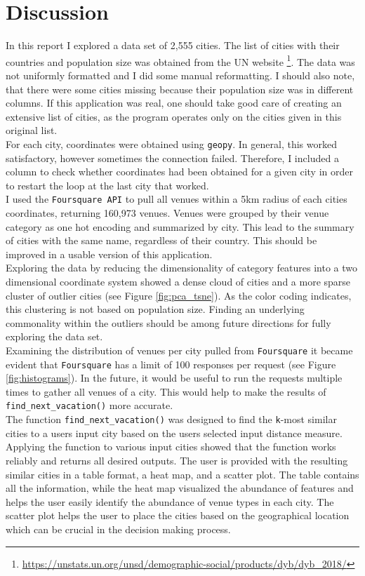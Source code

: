 \documentclass[11pt,a4paper,final]{article}
\begin{document}
\section{Discussion}
In this report I explored a data set of 2,555 cities. The list of cities with their countries and population size was obtained from the UN website \footnote{\url{https://unstats.un.org/unsd/demographic-social/products/dyb/dyb_2018/}}. The data was not uniformly formatted and I did some manual reformatting. I should also note, that there were some cities missing because their population size was in different columns. If this application was real, one should take good care of creating an extensive list of cities, as the program operates only on the cities given in this original list.\\
For each city, coordinates were obtained using \texttt{geopy}. In general, this worked satisfactory, however sometimes the connection failed. Therefore, I included a column to check whether coordinates had been obtained for a given city in order to restart the loop at the last city that worked. \\
I used the \texttt{Foursquare API} to pull all venues within a 5km radius of each cities coordinates, returning 160,973 venues. Venues were grouped by their venue category as one hot encoding and summarized by city. This lead to the summary of cities with the same name, regardless of their country. This should be improved in a usable version of this application.\\
Exploring the data by reducing the dimensionality of category features into a two dimensional coordinate system showed a dense cloud of cities and a more sparse cluster of outlier cities (see Figure \ref{fig:pca_tsne}). As the color coding indicates, this clustering is not based on population size. Finding an underlying commonality within the outliers should be among future directions for fully exploring the data set.\\
Examining the distribution of venues per city pulled from \texttt{Foursquare} it became evident that \texttt{Foursquare} has a limit of 100 responses per request (see Figure \ref{fig:histograms}). In the future, it would be useful to run the requests multiple times to gather all venues of a city. This would help to make the results of \texttt{find\_next\_vacation()} more accurate.\\
The function \texttt{find\_next\_vacation()} was designed to find the \texttt{k}-most similar cities to a users input city based on the users selected input distance measure. Applying the function to various input cities showed that the function works reliably and returns all desired outputs. The user is provided with the resulting similar cities in a table format, a heat map, and a scatter plot. The table contains all the information, while the heat map visualized the abundance of features and helps the user easily identify the abundance of venue types in each city. The scatter plot helps the user to place the cities based on the geographical location which can be crucial in the decision making process.\\
\end{document}
